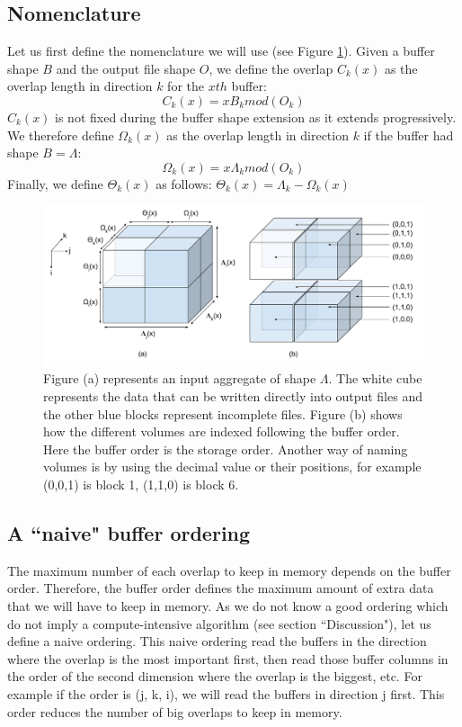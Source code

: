 \documentclass[conference]{IEEEtran}
\begin{document}
\subsection{Nomenclature}
Let us first define the nomenclature we will use (see Figure \ref{fig:nomenclature_overlaps}).
Given a buffer shape $B$ and the output file shape $O$, we define the overlap $C_k(x)$ as the overlap length in direction $k$ for the $x{th}$ buffer:
$$C_k(x) = xB_k mod(O_k)$$
$C_k(x)$ is not fixed during the buffer shape extension as it extends progressively.
We therefore define $\Omega_k(x)$ as the overlap length in direction $k$ if the buffer had shape $B=\Lambda$:
$$\Omega_k(x) = x\Lambda_k mod(O_k)$$
Finally, we define $\Theta_k(x)$ as follows:
$\Theta_k(x) = \Lambda_k - \Omega_k(x)$

\begin{figure}[h]
\centering
\includegraphics[scale=0.45]{./figures/new/nomenclature_overlaps.png}
\caption{Figure (a) represents an input aggregate of shape $\Lambda$. The white cube represents the data that can be written directly into output files and the other blue blocks represent incomplete files. Figure (b) shows how the different volumes are indexed following the buffer order. Here the buffer order is the storage order. Another way of naming volumes is by using the decimal value or their positions, for example (0,0,1) is block 1, (1,1,0) is block 6.
}
\label{fig:nomenclature_overlaps}
\end{figure}

\subsection{A ``naive" buffer ordering}
The maximum number of each overlap to keep in memory depends on the buffer order.
Therefore, the buffer order defines the maximum amount of extra data that we will have to keep in memory.
As we do not know a good ordering which do not imply a compute-intensive algorithm (see section ``Discussion"), let us define a naive ordering.
This naive ordering read the buffers in the direction where the overlap is the most important first, then read those buffer columns in the order of the second dimension where the overlap is the biggest, etc.
For example if the order is (j, k, i), we will read the buffers in direction j first.
This order reduces the number of big overlaps to keep in memory. \\
\end{document}
